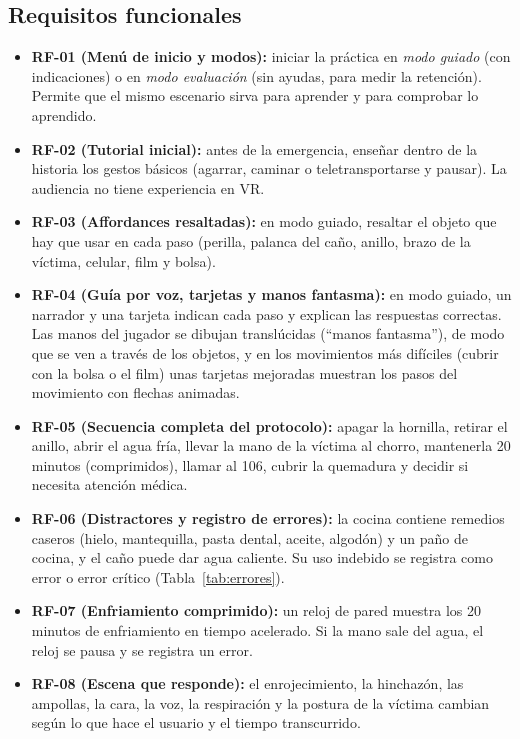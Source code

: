 \documentclass[11pt,a4paper]{article}
\begin{document}
\subsection{Requisitos funcionales}
\begin{itemize}
    \item \textbf{RF-01 (Menú de inicio y modos):} iniciar la práctica en \textit{modo guiado} (con indicaciones) o en \textit{modo evaluación} (sin ayudas, para medir la retención). Permite que el mismo escenario sirva para aprender y para comprobar lo aprendido.
    \item \textbf{RF-02 (Tutorial inicial):} antes de la emergencia, enseñar dentro de la historia los gestos básicos (agarrar, caminar o teletransportarse y pausar). La audiencia no tiene experiencia en VR.
    \item \textbf{RF-03 (Affordances resaltadas):} en modo guiado, resaltar el objeto que hay que usar en cada paso (perilla, palanca del caño, anillo, brazo de la víctima, celular, film y bolsa).
    \item \textbf{RF-04 (Guía por voz, tarjetas y manos fantasma):} en modo guiado, un narrador y una tarjeta indican cada paso y explican las respuestas correctas. Las manos del jugador se dibujan translúcidas (``manos fantasma''), de modo que se ven a través de los objetos, y en los movimientos más difíciles (cubrir con la bolsa o el film) unas tarjetas mejoradas muestran los pasos del movimiento con flechas animadas.
    \item \textbf{RF-05 (Secuencia completa del protocolo):} apagar la hornilla, retirar el anillo, abrir el agua fría, llevar la mano de la víctima al chorro, mantenerla 20 minutos (comprimidos), llamar al 106, cubrir la quemadura y decidir si necesita atención médica.
    \item \textbf{RF-06 (Distractores y registro de errores):} la cocina contiene remedios caseros (hielo, mantequilla, pasta dental, aceite, algodón) y un paño de cocina, y el caño puede dar agua caliente. Su uso indebido se registra como error o error crítico (Tabla~\ref{tab:errores}).
    \item \textbf{RF-07 (Enfriamiento comprimido):} un reloj de pared muestra los 20 minutos de enfriamiento en tiempo acelerado. Si la mano sale del agua, el reloj se pausa y se registra un error.
    \item \textbf{RF-08 (Escena que responde):} el enrojecimiento, la hinchazón, las ampollas, la cara, la voz, la respiración y la postura de la víctima cambian según lo que hace el usuario y el tiempo transcurrido.

\end{itemize}
\end{document}
